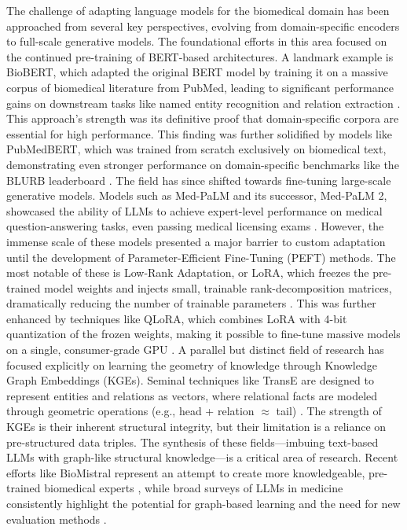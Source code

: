 \documentclass{article}
\begin{document}
The challenge of adapting language models for the biomedical domain has been approached from several key perspectives, evolving from domain-specific encoders to full-scale generative models. The foundational efforts in this area focused on the continued pre-training of BERT-based architectures. A landmark example is BioBERT, which adapted the original BERT model by training it on a massive corpus of biomedical literature from PubMed, leading to significant performance gains on downstream tasks like named entity recognition and relation extraction \cite{Lee2019BioBERTAP}. This approach's strength was its definitive proof that domain-specific corpora are essential for high performance. This finding was further solidified by models like PubMedBERT, which was trained from scratch exclusively on biomedical text, demonstrating even stronger performance on domain-specific benchmarks like the BLURB leaderboard \cite{gu2021pubmedbert}. The field has since shifted towards fine-tuning large-scale generative models. Models such as Med-PaLM and its successor, Med-PaLM 2, showcased the ability of LLMs to achieve expert-level performance on medical question-answering tasks, even passing medical licensing exams \cite{singhal2023medpalm, singhal2023medpalm2}. However, the immense scale of these models presented a major barrier to custom adaptation until the development of Parameter-Efficient Fine-Tuning (PEFT) methods. The most notable of these is Low-Rank Adaptation, or LoRA, which freezes the pre-trained model weights and injects small, trainable rank-decomposition matrices, dramatically reducing the number of trainable parameters \cite{hu2021lora}. This was further enhanced by techniques like QLoRA, which combines LoRA with 4-bit quantization of the frozen weights, making it possible to fine-tune massive models on a single, consumer-grade GPU \cite{dettmers2023qlora}. A parallel but distinct field of research has focused explicitly on learning the geometry of knowledge through Knowledge Graph Embeddings (KGEs). Seminal techniques like TransE are designed to represent entities and relations as vectors, where relational facts are modeled through geometric operations (e.g., head + relation $\approx$ tail) \cite{bordes2013transe}. The strength of KGEs is their inherent structural integrity, but their limitation is a reliance on pre-structured data triples. The synthesis of these fields—imbuing text-based LLMs with graph-like structural knowledge—is a critical area of research. Recent efforts like BioMistral represent an attempt to create more knowledgeable, pre-trained biomedical experts \cite{labrak2024biomistral}, while broad surveys of LLMs in medicine consistently highlight the potential for graph-based learning and the need for new evaluation methods \cite{thirunavukarasu2023llms}. 
\end{document}
